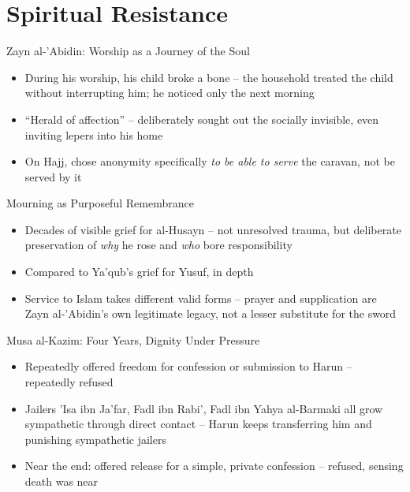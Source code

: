 \section{Spiritual Resistance}

\begin{frame}{Zayn al-'Abidin: Worship as a Journey of the Soul}
\begin{itemize}[itemsep=5pt]
  \item During his worship, his child broke a bone -- the household treated the child without interrupting him; he noticed only the next morning
  \item ``Herald of affection'' -- deliberately sought out the socially invisible, even inviting lepers into his home
  \item On Hajj, chose anonymity specifically \emph{to be able to serve} the caravan, not be served by it
\end{itemize}
\end{frame}

\begin{frame}{Mourning as Purposeful Remembrance}
\begin{itemize}[itemsep=5pt]
  \item Decades of visible grief for al-Husayn -- not unresolved trauma, but deliberate preservation of \emph{why} he rose and \emph{who} bore responsibility
  \item Compared to Ya'qub's grief for Yusuf, in depth
  \item Service to Islam takes different valid forms -- prayer and supplication are Zayn al-'Abidin's own legitimate legacy, not a lesser substitute for the sword
\end{itemize}
\end{frame}

\begin{frame}{Musa al-Kazim: Four Years, Dignity Under Pressure}
\begin{itemize}[itemsep=5pt]
  \item Repeatedly offered freedom for confession or submission to Harun -- repeatedly refused
  \item Jailers 'Isa ibn Ja'far, Fadl ibn Rabi', Fadl ibn Yahya al-Barmaki all grow sympathetic through direct contact -- Harun keeps transferring him and punishing sympathetic jailers
  \item Near the end: offered release for a simple, private confession -- refused, sensing death was near
\end{itemize}
\end{frame}

